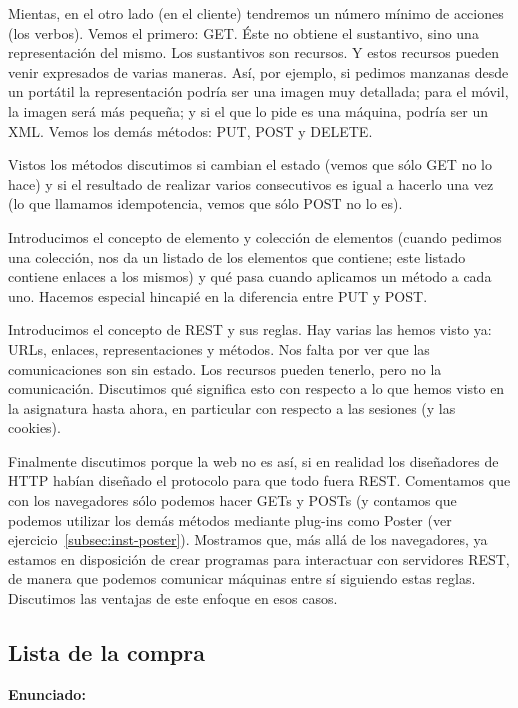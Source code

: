 Mientas, en el otro lado (en el cliente) tendremos un número mínimo de acciones (los verbos). Vemos el primero: GET. Éste no obtiene el sustantivo, sino una representación del mismo. Los sustantivos son recursos. Y estos recursos pueden venir expresados de varias maneras. Así, por ejemplo, si pedimos manzanas desde un portátil la representación podría ser una imagen muy detallada; para el móvil, la imagen será más pequeña; y si el que lo pide es una máquina, podría ser un XML. Vemos los demás métodos: PUT, POST y DELETE.

Vistos los métodos discutimos si cambian el estado (vemos que sólo GET no lo hace) y si el resultado de realizar varios consecutivos es igual a hacerlo una vez (lo que llamamos idempotencia, vemos que sólo POST no lo es).

Introducimos el concepto de elemento y colección de elementos (cuando pedimos una colección, nos da un listado de los elementos que contiene; este listado contiene enlaces a los mismos) y qué pasa cuando aplicamos un método a cada uno. Hacemos especial hincapié en la diferencia entre PUT y POST.

Introducimos el concepto de REST y sus reglas. Hay varias las hemos visto ya: URLs, enlaces, representaciones y métodos. Nos falta por ver que las comunicaciones son sin estado. Los recursos pueden tenerlo, pero no la comunicación. Discutimos qué significa esto con respecto a lo que hemos visto en la asignatura hasta ahora, en particular con respecto a las sesiones (y las cookies).

Finalmente discutimos porque la web no es así, si en realidad los diseñadores de HTTP habían diseñado el protocolo para que todo fuera REST. Comentamos que con los navegadores sólo podemos hacer GETs y POSTs (y contamos que podemos utilizar los demás métodos mediante plug-ins como Poster (ver ejercicio~\ref{subsec:inst-poster}). Mostramos que, más allá de los navegadores, ya estamos en disposición de crear programas para interactuar con servidores REST, de manera que podemos comunicar máquinas entre sí siguiendo estas reglas. Discutimos las ventajas de este enfoque en esos casos.


\subsection{Lista de la compra}
\label{subsec:lista-compra}

\textbf{Enunciado:}

